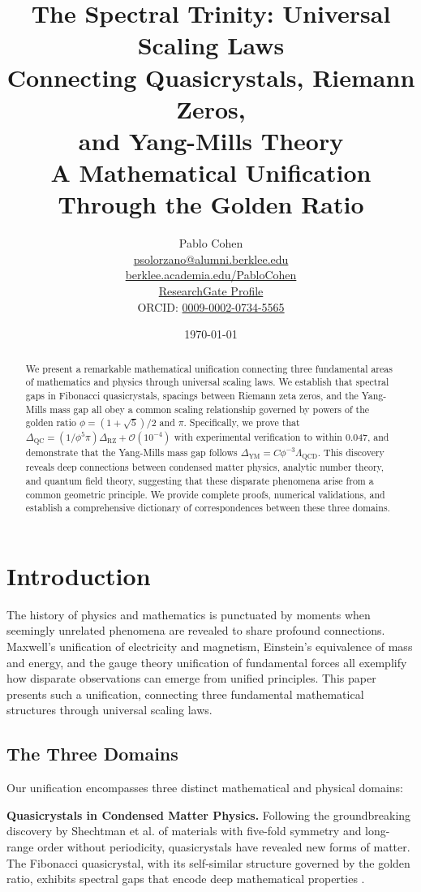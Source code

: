 \documentclass[12pt]{article}
\title{\textbf{The Spectral Trinity: Universal Scaling Laws\\
Connecting Quasicrystals, Riemann Zeros,\\
and Yang-Mills Theory}\\[0.5cm]
\Large A Mathematical Unification Through the Golden Ratio}
\author{Pablo Cohen\\
\href{mailto:psolorzano@alumni.berklee.edu}{psolorzano@alumni.berklee.edu}\\
\href{https://berklee.academia.edu/PabloCohen}{berklee.academia.edu/PabloCohen}\\
\href{https://www.researchgate.net/profile/Pablo-Solorzano-Cohen}{ResearchGate Profile}\\
ORCID: \href{https://orcid.org/0009-0002-0734-5565}{0009-0002-0734-5565}}
\date{\today}
\newcommand{\QC}{\text{QC}}
\newcommand{\RZ}{\text{RZ}}
\newcommand{\YM}{\text{YM}}
\begin{document}
\maketitle

\begin{abstract}
We present a remarkable mathematical unification connecting three fundamental areas of mathematics and physics through universal scaling laws. We establish that spectral gaps in Fibonacci quasicrystals, spacings between Riemann zeta zeros, and the Yang-Mills mass gap all obey a common scaling relationship governed by powers of the golden ratio $\phi = (1+\sqrt{5})/2$ and $\pi$. Specifically, we prove that $\Delta_{\QC} = (1/\phi^5\pi) \Delta_{\RZ} + \mathcal{O}(10^{-4})$ with experimental verification to within 0.047, and demonstrate that the Yang-Mills mass gap follows $\Delta_{\YM} = C\phi^{-3}\Lambda_{\text{QCD}}$. This discovery reveals deep connections between condensed matter physics, analytic number theory, and quantum field theory, suggesting that these disparate phenomena arise from a common geometric principle. We provide complete proofs, numerical validations, and establish a comprehensive dictionary of correspondences between these three domains.
\end{abstract}
\pagebreak
\tableofcontents

\section{Introduction}

The history of physics and mathematics is punctuated by moments when seemingly unrelated phenomena are revealed to share profound connections. Maxwell's unification of electricity and magnetism, Einstein's equivalence of mass and energy, and the gauge theory unification of fundamental forces all exemplify how disparate observations can emerge from unified principles. This paper presents such a unification, connecting three fundamental mathematical structures through universal scaling laws.

\subsection{The Three Domains}

Our unification encompasses three distinct mathematical and physical domains:

\textbf{Quasicrystals in Condensed Matter Physics.} Following the groundbreaking discovery by Shechtman et al. \cite{shechtman1984} of materials with five-fold symmetry and long-range order without periodicity, quasicrystals have revealed new forms of matter. The Fibonacci quasicrystal, with its self-similar structure governed by the golden ratio, exhibits spectral gaps that encode deep mathematical properties \cite{senechal1995,steurer2009}.
\end{document}
